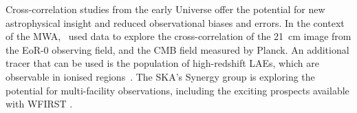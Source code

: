 Cross-correlation studies from the early Universe offer the potential for new astrophysical insight and reduced observational biases and errors. In the context of the MWA,~\cite{yoshiura19} used data to explore the cross-correlation of the 21~cm image from the EoR-0 observing field, and the CMB field measured by Planck. An additional tracer that can be used is the population of high-redshift LAEs, which are observable in ionised regions~\cite{yoshiura18,kubota18,hutter17}. The SKA's Synergy group is exploring the potential for multi-facility observations, including the exciting prospects available with WFIRST \cite{hutter19}.







